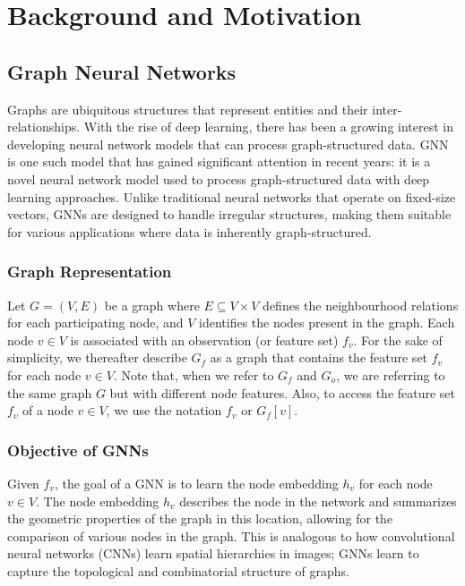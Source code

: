 \section{Background and Motivation}
\label{acsos2023:sec:background}
\subsection{Graph Neural Networks}

Graphs are ubiquitous structures that represent entities and their inter-relationships. With the rise of deep learning, there has been a growing interest in developing neural network models that can process graph-structured data. \ac{GNN} is one such model that has gained significant attention in recent years: it is a novel neural network model used to process graph-structured data with deep learning approaches. 
 Unlike traditional neural networks that operate on fixed-size vectors, \acp{GNN} are designed to handle irregular structures, 
 making them suitable for various applications where data is inherently graph-structured.

\subsubsection{Graph Representation}
Let $G = (V, E)$ be a graph where $E\subseteq V\times V$ defines the neighbourhood relations for each participating node, 
 and $V$ identifies the nodes present in the graph. 
 Each node $v \in V$ is associated with an observation (or feature set) $f_v$. For the sake of simplicity, 
 we thereafter describe $G_f$ as a graph that contains the feature set $f_v$ for each node $v \in V$. 
 Note that, when we refer to $G_f$ and $G_o$, 
 we are referring to the same graph $G$ but with different node features. 
 Also, to access the feature set $f_v$ of a node $v \in V$, we use the notation $f_v$ or $G_f[v]$.

\subsubsection{Objective of GNNs}

Given $f_v$, the goal of a \ac{GNN} is to learn the node embedding $h_v$ for each node $v \in V$. 
 The node embedding $h_v$ describes the node in the network and summarizes the geometric properties of the graph in this location, 
 allowing for the comparison of various nodes in the graph. 
 This is analogous to how convolutional neural networks (CNNs) learn spatial hierarchies in images; 
 \acp{GNN} learn to capture the topological and combinatorial structure of graphs.

